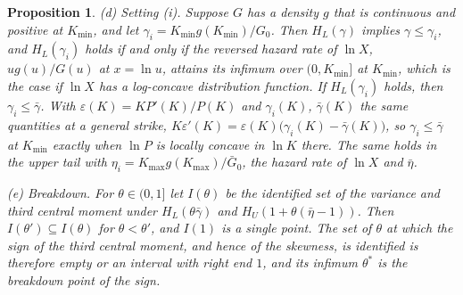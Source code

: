 \documentclass[11pt]{article}
\newtheorem{proposition}{Proposition}
\theoremstyle{remark}
\begin{document}
\begin{proposition}
(d) \emph{Setting (i).} Suppose $G$ has a density $g$ that is continuous and positive at $K_{\min}$, and let $\gamma_i=K_{\min}g(K_{\min})/G_0$. Then $H_L(\gamma)$ implies $\gamma\le\gamma_i$, and $H_L(\gamma_i)$ holds if and only if the reversed hazard rate of $\ln X$, $ug(u)/G(u)$ at $x=\ln u$, attains its infimum over $(0,K_{\min}]$ at $K_{\min}$, which is the case if $\ln X$ has a log-concave distribution function. If $H_L(\gamma_i)$ holds, then $\gamma_i\le\bar\gamma$. With $\varepsilon(K)=KP'(K)/P(K)$ and $\gamma_i(K)$, $\bar\gamma(K)$ the same quantities at a general strike, $K\varepsilon'(K)=\varepsilon(K)\bigl(\gamma_i(K)-\bar\gamma(K)\bigr)$, so $\gamma_i\le\bar\gamma$ at $K_{\min}$ exactly when $\ln P$ is locally concave in $\ln K$ there. The same holds in the upper tail with $\eta_i=K_{\max}g(K_{\max})/\bar G_0$, the hazard rate of $\ln X$ and $\bar\eta$.

(e) \emph{Breakdown.} For $\theta\in(0,1]$ let $I(\theta)$ be the identified set of the variance and third central moment under $H_L(\theta\bar\gamma)$ and $H_U(1+\theta(\bar\eta-1))$. Then $I(\theta')\subseteq I(\theta)$ for $\theta<\theta'$, and $I(1)$ is a single point. The set of $\theta$ at which the sign of the third central moment, and hence of the skewness, is identified is therefore empty or an interval with right end $1$, and its infimum $\theta^*$ is the breakdown point of the sign.
\end{proposition}
\end{document}
